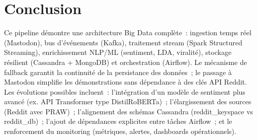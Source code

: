 \documentclass[12pt,a4paper]{article}
\begin{document}
\section{Conclusion}

Ce pipeline démontre une architecture Big Data complète~: ingestion temps réel (Mastodon), bus d'événements (Kafka), traitement stream (Spark Structured Streaming), enrichissement NLP/ML (sentiment, LDA, viralité), stockage résilient (Cassandra + MongoDB) et orchestration (Airflow). Le mécanisme de fallback garantit la continuité de la persistance des données~; le passage à Mastodon simplifie les démonstrations sans dépendance à des clés API Reddit. Les évolutions possibles incluent~: l'intégration d'un modèle de sentiment plus avancé (ex. API Transformer type DistilRoBERTa)~; l'élargissement des sources (Reddit avec PRAW)~; l'alignement des schémas Cassandra (reddit\_keyspace vs reddit\_db)~; l'ajout de dépendances explicites entre tâches Airflow~; et le renforcement du monitoring (métriques, alertes, dashboards opérationnels).
\end{document}
